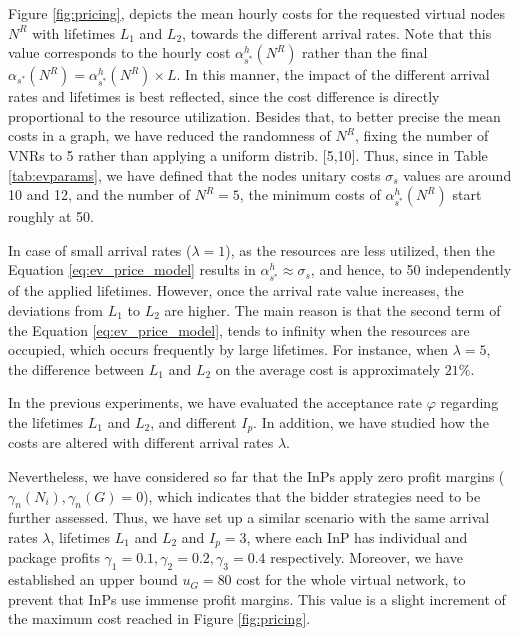 Figure \ref{fig:pricing}, depicts the mean hourly costs for the requested virtual nodes $N^R$ with lifetimes $L_1$ and $L_2$, towards the different arrival rates. Note that this value corresponds to the hourly cost $\alpha^{h}_{s^{*}}(N^R)$ rather than the final $ \alpha_{s^{*}}(N^R) = \alpha^{h}_{s^{*}}(N^R) \times L$. In this manner, the impact of the different arrival rates and lifetimes is best reflected, since the cost difference is directly proportional to the resource utilization. Besides that, to better precise the mean costs in a graph, we have reduced the randomness of $N^R$, fixing the number of VNRs to 5 rather than applying a uniform distrib. [5,10]. Thus, since in Table \ref{tab:evparams}, we have defined that the nodes unitary costs $\sigma_s$ values are around 10 and 12, and the number of $N^R = 5$, the minimum costs of $\alpha^{h}_{s^{*}}(N^R)$ start roughly at 50.

In case of small arrival rates ($\lambda = 1$), as the resources are less utilized, then the Equation \ref{eq:ev_price_model} results in $\alpha^{h}_{s^{*}} \approx \sigma_s$, and hence, to 50 independently of the applied lifetimes. However, once the arrival rate value increases, the deviations from $L_1$ to $L_2$ are higher. The main reason is that the second term of the Equation \ref{eq:ev_price_model}, tends to infinity when the resources are occupied, which occurs frequently by large lifetimes. For instance, when $\lambda = 5$, the difference between $L_1$ and $L_2$ on the average cost is approximately $21\%$.


In the previous experiments, we have evaluated the acceptance rate $\varphi$ regarding the lifetimes $L_1$ and $L_2$, and different $I_p$. In addition, we have studied how the costs are altered with different arrival rates $\lambda$. 

Nevertheless, we have considered so far that the InPs apply zero profit margins ($\gamma_n(N_i), \gamma_n(G) = 0$), which indicates that the bidder strategies need to be further assessed. Thus, we have set up a similar scenario with the same arrival rates $\lambda$, lifetimes $L_1$ and $L_2$ and $I_p = 3$, where each InP has individual and package profits $\gamma_1 = 0.1, \gamma_2 = 0.2, \gamma_3 = 0.4$ respectively. Moreover, we have established an upper bound $u_G = 80$ cost for the whole virtual network, to prevent that InPs use immense profit margins. This value is a slight increment of the maximum cost reached in Figure \ref{fig:pricing}.

